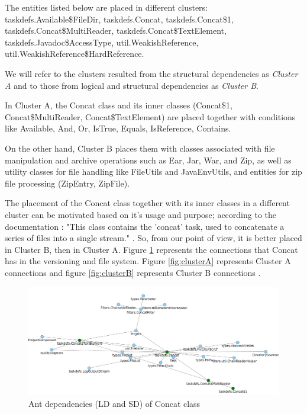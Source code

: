 \documentclass[conference]{IEEEtran}
\begin{document}
The entities listed below are placed in different clusters: taskdefs.Available\$FileDir, taskdefs.Concat, taskdefs.Concat\$1, taskdefs.Concat\$MultiReader, taskdefs.Concat\$TextElement, taskdefs.Javadoc\$AccessType, util.WeakishReference, util.WeakishReference\$HardReference.

We will refer to the clusters resulted from the structural dependencies as \textit{Cluster A} and to those from logical and structural dependencies as \textit{Cluster B}.



In Cluster A, the Concat class and its inner classes (Concat\$1, Concat\$MultiReader, Concat\$TextElement) are placed together with conditions like Available, And, Or, IsTrue, Equals, IsReference, Contains.

On the other hand, Cluster B places them with classes associated with file manipulation and archive operations such as Ear, Jar, War, and Zip, as well as utility classes for file handling like FileUtils and JavaEnvUtils, and entities for zip file processing (ZipEntry, ZipFile).


The placement of the Concat class together with its inner classes in a different cluster can be motivated based on it's usage and purpose; according to the documentation : "This class contains the 'concat' task, used to concatenate a series of files into a single stream." \cite{ant_concat}. 
So, from our point of view, it is better placed in Cluster B, then in Cluster A.
Figure \ref{fig:cluster1} represents the connections that Concat has in the versioning and file system. Figure \ref{fig:clusterA} represents Cluster A connections and figure \ref{fig:clusterB} represents Cluster B connections  .



\begin{figure}
\centering
\includegraphics[width=\columnwidth]{dep.png}
\caption{Ant dependencies (LD and SD) of Concat class}
\label{fig:cluster1}
\centering
\end{figure}
\end{document}
